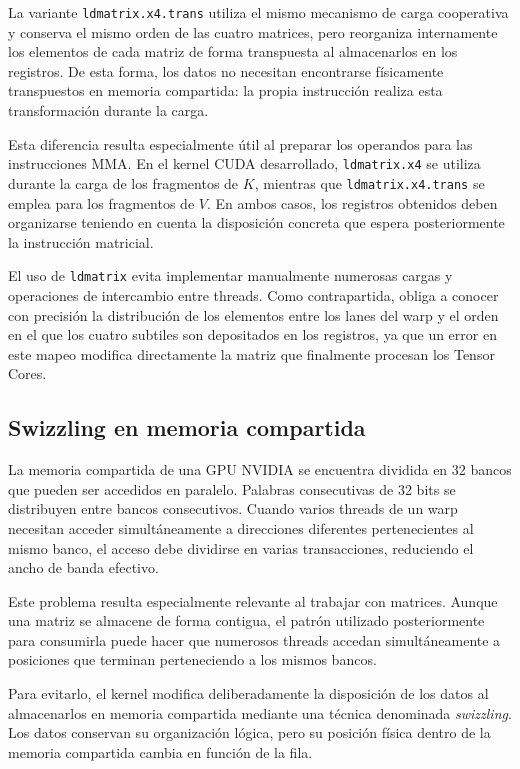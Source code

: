 La variante \texttt{ldmatrix.x4.trans} utiliza el mismo mecanismo de carga cooperativa y conserva el mismo orden de las cuatro matrices, pero reorganiza internamente los elementos de cada matriz de forma transpuesta al almacenarlos en los registros. De esta forma, los datos no necesitan encontrarse físicamente transpuestos en memoria compartida: la propia instrucción realiza esta transformación durante la carga.

Esta diferencia resulta especialmente útil al preparar los operandos para las instrucciones MMA. En el kernel CUDA desarrollado, \texttt{ldmatrix.x4} se utiliza durante la carga de los fragmentos de \(K\), mientras que \texttt{ldmatrix.x4.trans} se emplea para los fragmentos de \(V\). En ambos casos, los registros obtenidos deben organizarse teniendo en cuenta la disposición concreta que espera posteriormente la instrucción matricial.

El uso de \texttt{ldmatrix} evita implementar manualmente numerosas cargas y operaciones de intercambio entre threads. Como contrapartida, obliga a conocer con precisión la distribución de los elementos entre los lanes del warp y el orden en el que los cuatro subtiles son depositados en los registros, ya que un error en este mapeo modifica directamente la matriz que finalmente procesan los Tensor Cores.

\subsection{Swizzling en memoria compartida}

La memoria compartida de una GPU NVIDIA se encuentra dividida en 32 bancos que pueden ser accedidos en paralelo. Palabras consecutivas de 32 bits se distribuyen entre bancos consecutivos. Cuando varios threads de un warp necesitan acceder simultáneamente a direcciones diferentes pertenecientes al mismo banco, el acceso debe dividirse en varias transacciones, reduciendo el ancho de banda efectivo.

Este problema resulta especialmente relevante al trabajar con matrices. Aunque una matriz se almacene de forma contigua, el patrón utilizado posteriormente para consumirla puede hacer que numerosos threads accedan simultáneamente a posiciones que terminan perteneciendo a los mismos bancos.

Para evitarlo, el kernel modifica deliberadamente la disposición de los datos al almacenarlos en memoria compartida mediante una técnica denominada \textit{swizzling}. Los datos conservan su organización lógica, pero su posición física dentro de la memoria compartida cambia en función de la fila.

